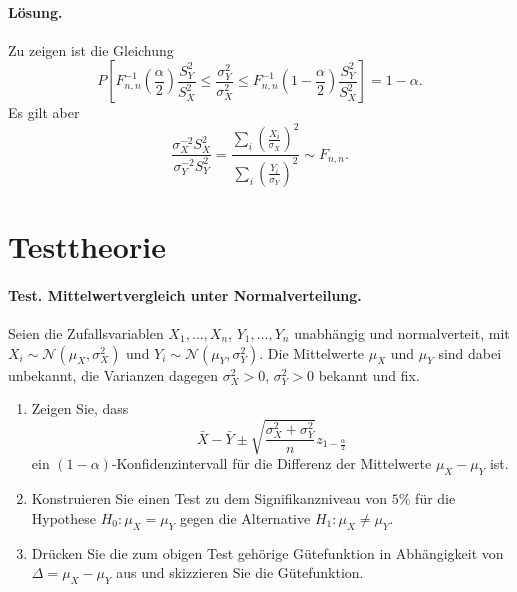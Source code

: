 \paragraph*{Lösung.} Zu zeigen ist die Gleichung
\begin{equation*}
    P \left[ F^{-1}_{n,n} \left( \frac{\alpha}{2} \right) \frac{S_Y^2}{S_X^2} \leq 
    \frac{\sigma^2_Y}{\sigma^2_X} \leq
    F^{-1}_{n,n} \left( 1 - \frac{\alpha}{2}  \right) \frac{S_Y^2}{S_X^2}     \right]
    = 1-\alpha.
\end{equation*}
Es gilt aber 
\begin{equation*}
    \frac{\sigma^{-2}_X S^2_X  }{ \sigma^{-2}_Y S^2_Y} = 
    \frac{\sum_{i}^{} \left( \frac{X_i}{\sigma_X} \right)^2  }{ \sum_{i}^{} \left( \frac{Y_i}{\sigma_Y} \right)^2 } \sim F_{n,n}.
\end{equation*}







\section{Testtheorie}

\paragraph{Test. Mittelwertvergleich unter Normalverteilung. } 
Seien die Zufallsvariablen $X_1,\ldots,X_n$, $Y_1,\ldots,Y_n$ unabhängig und normalverteit, 
mit $X_i\sim\mathcal N(\mu_X, \sigma^2_X)$ und $Y_i\sim\mathcal N(\mu_Y, \sigma^2_Y)$.
Die Mittelwerte $\mu_X$ und $\mu_Y$ sind dabei unbekannt, die Varianzen dagegen
$\sigma_X^2>0$, $\sigma^2_Y>0$ bekannt und fix.
\begin{enumerate}
    \item Zeigen Sie, dass 
        \begin{equation*}
            \bar X - \bar Y \pm \sqrt{ \frac{\sigma^2_X + \sigma^2_Y}{n}  }z_{1-\frac{\alpha}{2}}
        \end{equation*}
        ein $(1-\alpha)$-Konfidenzintervall für die Differenz der Mittelwerte $\mu_X - \mu_Y$ ist.
    \item Konstruieren Sie einen Test zu dem Signifikanzniveau von $5\%$ für die Hypothese
        $H_0: \mu_X = \mu_Y$ gegen die Alternative $H_1: \mu_X \neq \mu_Y$.
    \item Drücken Sie die zum obigen Test gehörige Gütefunktion in Abhängigkeit von
        $\Delta = \mu_X -\mu_Y$ aus und skizzieren Sie die Gütefunktion. 
\end{enumerate}

